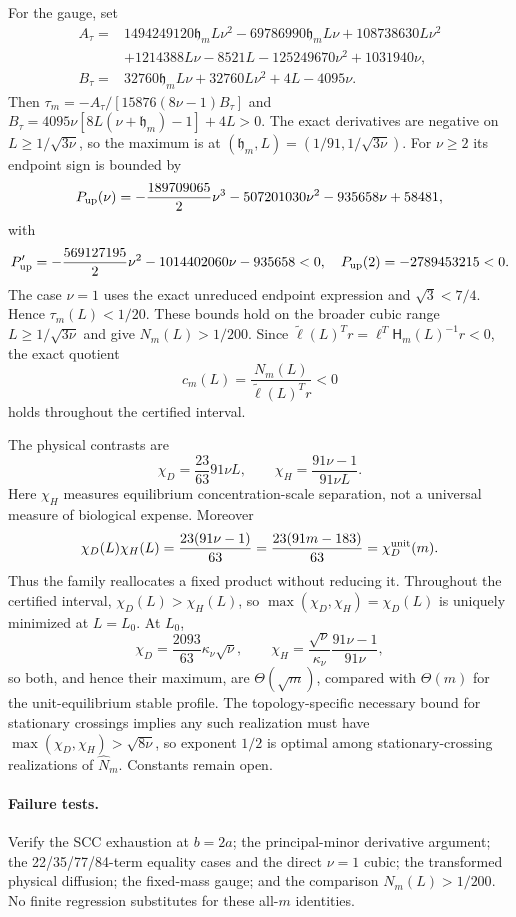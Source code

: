 \documentclass[10pt]{article}
\begin{document}
For the gauge, set
\begin{align*}
A_\tau={}&1494249120\mathfrak h_mL\nu^2-69786990\mathfrak h_mL\nu
+108738630L\nu^2\\
&+1214388L\nu-8521L-125249670\nu^2+1031940\nu,\\
B_\tau={}&32760\mathfrak h_mL\nu+32760L\nu^2+4L-4095\nu.
\end{align*}
Then $\tau_m=-A_\tau/[15876(8\nu-1)B_\tau]$ and
$B_\tau=4095\nu[8L(\nu+\mathfrak h_m)-1]+4L>0$.  The exact derivatives
are negative on $L\ge1/\sqrt{3\nu}$, so the maximum is at
$(\mathfrak h_m,L)=(1/91,1/\sqrt{3\nu})$.  For $\nu\ge2$ its endpoint sign
is bounded by
\[
P_{\rm up}(\nu)=-\frac{189709065}{2}\nu^3-507201030\nu^2-935658\nu+58481,
\]
with
\[
P_{\rm up}'=-\frac{569127195}{2}\nu^2-1014402060\nu-935658<0,
\quad P_{\rm up}(2)=-2789453215<0.
\]
The case $\nu=1$ uses the exact unreduced endpoint expression and
$\sqrt3<7/4$.  Hence $\tau_m(L)<1/20$.  These bounds hold on the broader
cubic range $L\ge1/\sqrt{3\nu}$ and give
$N_m(L)>1/200$.  Since $\widetilde\ell(L)^Tr
=\ell^T\mathsf H_m(L)^{-1}r<0$, the exact quotient
\[
c_m(L)=\frac{N_m(L)}{\widetilde\ell(L)^Tr}<0
\]
holds throughout the certified interval.

The physical contrasts are
\[
\chi_D=\frac{23}{63}91\nu L,\qquad
\chi_H=\frac{91\nu-1}{91\nu L}.
\]
Here $\chi_H$ measures equilibrium concentration-scale separation, not a
universal measure of biological expense.  Moreover
\[
\chi_D(L)\chi_H(L)=\frac{23(91\nu-1)}{63}
=\frac{23(91m-183)}{63}=\chi_D^{\rm unit}(m).
\]
Thus the family reallocates a fixed product without reducing it.  Throughout
the certified interval, $\chi_D(L)>\chi_H(L)$, so
$\max(\chi_D,\chi_H)=\chi_D(L)$ is uniquely minimized at $L=L_0$.
At $L_0$,
\[
 \chi_D=\frac{2093}{63}\kappa_\nu\sqrt\nu,
 \qquad
 \chi_H=\frac{\sqrt\nu}{\kappa_\nu}\frac{91\nu-1}{91\nu},
\]
so both, and hence their maximum, are $\Theta(\sqrt m)$, compared with
$\Theta(m)$ for the unit-equilibrium stable profile. The topology-specific necessary bound for
stationary crossings implies any such realization must have
$\max(\chi_D,\chi_H)>\sqrt{8\nu}$, so exponent $1/2$ is optimal among
stationary-crossing realizations of $\widehat N_m$. Constants remain open.

\paragraph{Failure tests.} Verify the SCC exhaustion at $b=2a$; the
principal-minor derivative argument; the 22/35/77/84-term equality cases and
the direct $\nu=1$ cubic; the transformed physical diffusion; the fixed-mass
gauge; and the comparison $N_m(L)>1/200$. No finite regression substitutes
for these all-$m$ identities.
\end{document}
